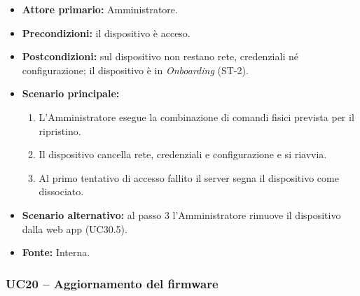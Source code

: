 \documentclass[12pt,a4paper]{article}
\newcommand{\tightlist}{\setlength{\itemsep}{1pt}\setlength{\parskip}{0pt}}
\begin{document}
\begin{itemize}

\tightlist

\item \textbf{Attore primario:} Amministratore.

\item \textbf{Precondizioni:} il dispositivo è acceso.

\item \textbf{Postcondizioni:} sul dispositivo non restano rete, credenziali né configurazione; il dispositivo è in \emph{Onboarding} (ST-2).

\item \textbf{Scenario principale:}

\begin{enumerate}

\tightlist

\item L'Amministratore esegue la combinazione di comandi fisici prevista per il ripristino.

\item Il dispositivo cancella rete, credenziali e configurazione e si riavvia.

\item Al primo tentativo di accesso fallito il server segna il dispositivo come dissociato.

\end{enumerate}

\item \textbf{Scenario alternativo:} al passo 3 l'Amministratore rimuove il dispositivo dalla web app (UC30.5).

\item \textbf{Fonte:} Interna.

\end{itemize}



\subsubsection{UC20 -- Aggiornamento del firmware}
\end{document}
